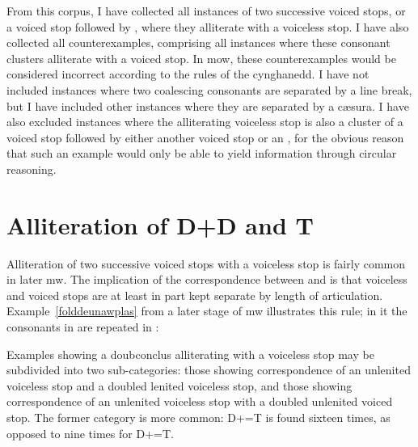 From this corpus, I have collected all instances of two successive voiced stops, or a voiced stop followed by , where they alliterate with a voiceless stop. I have also collected all counterexamples, comprising all instances where these consonant clusters alliterate with a voiced stop. In \gls{mow}, these counterexamples would be considered incorrect according to the rules of the cynghanedd. I have not included instances where two coalescing consonants are separated by a line break, but I have included other instances where they are separated by a cæsura. I have also excluded instances where the alliterating voiceless stop is also a cluster of a voiced stop followed by either another voiced stop or an , for the obvious reason that such an example would only be able to yield information through circular reasoning. 

\section{Alliteration of  \gls{D}+\gls{D} and \gls{T}}
\label{ddt}
Alliteration of two successive voiced stops with a voiceless stop is fairly common in later \gls{mw}. The implication of the correspondence between  and  is that voiceless and voiced stops are at least in part kept separate by length of articulation. Example~\ref{folddeunawplas} from a later stage of \gls{mw}  illustrates this rule; in it the consonants in  are repeated in :

Examples showing a \gls{doubconclus} alliterating with a voiceless stop may be subdivided into two sub-categories: those showing correspondence of an unlenited voiceless stop and a doubled lenited voiceless stop, and those showing correspondence of an unlenited voiceless stop with a doubled unlenited voiced stop. The former category is more common: \gls{D}+\lT=\gls{T} is found sixteen times, as opposed to nine times for \gls{D}+\xD=\gls{T}.

